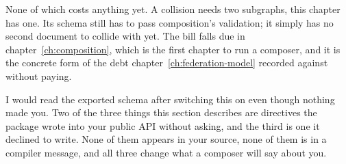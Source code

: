 %
None of which costs anything yet. A collision needs two subgraphs, this chapter
has one. Its schema still has to pass composition's validation; it simply
has no second document to collide with yet. The bill falls due in
chapter~\ref{ch:composition}, which is the first chapter to run a composer, and
it is the concrete form of the debt chapter~\ref{ch:federation-model} recorded
against  without paying.

%
I would read the exported schema after switching this on even though nothing
made you. Two of the three things this section describes are directives the
package wrote into your public API without asking, and the third is one it
declined to write. None of them appears in your source, none of them is in a
compiler message, and all three change what a composer will say about you.
%
